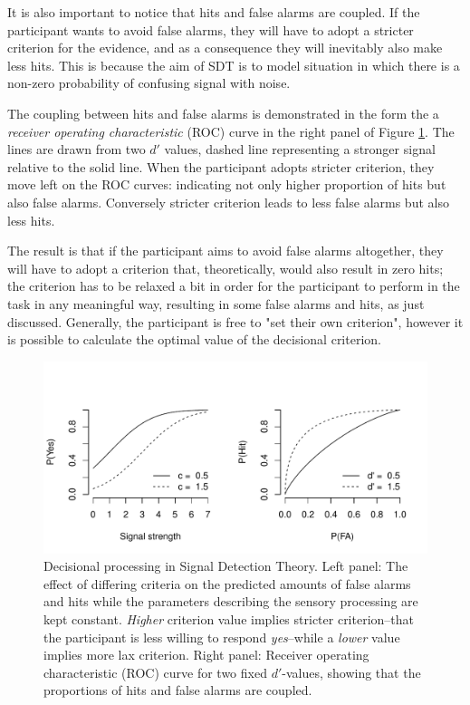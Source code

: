 \documentclass{article}\usepackage{knitr}
\begin{document}
It is also important to notice that hits and false alarms are coupled. If the participant wants to avoid false alarms, they will have to adopt a stricter criterion for the evidence, and  as a consequence they  will inevitably also make less hits. This is because the aim of SDT is to model situation in which there is a non-zero probability of confusing signal with noise. 

The coupling between hits and false alarms is demonstrated in the form the a \textit{receiver operating characteristic} (ROC) curve \cite[161]{kingdomprins2010} in the right panel of Figure \ref{fig:critchange}. The lines are drawn from two $d'$ values, dashed line representing a stronger signal relative to the solid line. When the participant adopts stricter criterion, they move left on the ROC curves: indicating not only higher proportion of hits but also false alarms. Conversely stricter criterion leads to less false alarms but also less hits.

The result is that if the participant aims to avoid false alarms altogether, they will have to adopt a criterion that, theoretically, would also result in zero hits; the criterion has to be relaxed a bit in order for the participant to perform in the task in any meaningful way, resulting in some false alarms and hits, as just discussed. Generally, the participant is free to "set their own criterion", however it is possible to calculate the optimal value of the decisional criterion. 

\begin{figure}[!htb]
\begin{center}
\begin{knitrout}
\color{fgcolor}
\includegraphics[width=\maxwidth]{figure/unnamed-chunk-6-1} 
\end{knitrout}
\end{center}
\caption{ Decisional processing in Signal Detection Theory. Left panel: The effect of differing criteria on the predicted amounts of false alarms and hits while the parameters describing the sensory processing are kept constant. \textit{Higher} criterion value implies stricter criterion--that the participant is less willing to respond \textit{yes}--while a \textit{lower} value implies more lax criterion. Right panel: Receiver operating characteristic (ROC) curve for two fixed $d'$-values, showing that the proportions of hits and false alarms are coupled.}
\label{fig:critchange}
\end{figure}
\end{document}
